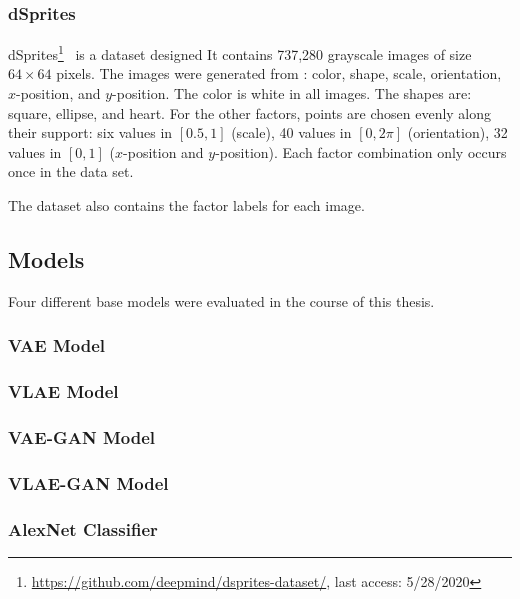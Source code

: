 \subsubsection{dSprites}
dSprites\footnote{\href{https://github.com/deepmind/dsprites-dataset/}{https://github.com/deepmind/dsprites-dataset/}, last access: 5/28/2020}~\citep{dsprites17} is a dataset designed 
It contains 737,280 grayscale images of size $64\times 64$ pixels.
The images were generated from : color, shape, scale, orientation, $x$-position, and $y$-position.
The color is white in all images.
The shapes are: square, ellipse, and heart.
For the other factors, points are chosen evenly along their support: six values in $[0.5, 1]$ (scale), 40 values in $[0, 2\pi]$ (orientation), 32 values in $[0, 1]$ ($x$-position and $y$-position).
Each factor combination only occurs once in the data set.

The dataset also contains the factor labels for each image.

\subsection{Models}\label{subsec:models}

Four different base models were evaluated in the course of this thesis.

\subsubsection{VAE Model}

\subsubsection{VLAE Model}

\subsubsection{VAE-GAN Model}

\subsubsection{VLAE-GAN Model}

\subsubsection{AlexNet Classifier}

